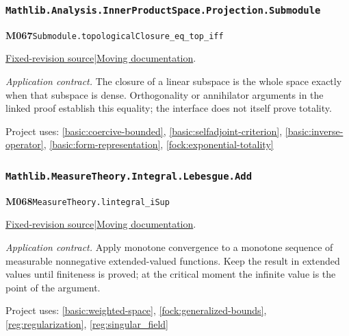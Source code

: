 \documentclass[11pt,a4paper]{article}
\theoremstyle{definition}
\theoremstyle{remark}
\begin{document}
\subsubsection*{\nolinkurl{Mathlib.Analysis.InnerProductSpace.Projection.Submodule}}
\noindent\textbf{M067}\label{base:M067}\quad\nolinkurl{Submodule.topologicalClosure_eq_top_iff}

\href{https://github.com/leanprover-community/mathlib4/blob/9bac2d0692944a775113f7c130fd5e5b4608a854/Mathlib/Analysis/InnerProductSpace/Projection/Submodule.lean}{Fixed-revision source}\quad|\quad\href{https://leanprover-community.github.io/mathlib4_docs/Mathlib/Analysis/InnerProductSpace/Projection/Submodule.html#Submodule.topologicalClosure_eq_top_iff}{Moving documentation}.\par
\noindent\textit{Application contract.} The closure of a linear subspace is the whole space exactly when that subspace is dense. Orthogonality or annihilator arguments in the linked proof establish this equality; the interface does not itself prove totality.\par
{\small Project uses: \ref{basic:coercive-bounded}, \ref{basic:selfadjoint-criterion}, \ref{basic:inverse-operator}, \ref{basic:form-representation}, \ref{fock:exponential-totality}}\par\medskip

\subsubsection*{\nolinkurl{Mathlib.MeasureTheory.Integral.Lebesgue.Add}}
\noindent\textbf{M068}\label{base:M068}\quad\nolinkurl{MeasureTheory.lintegral_iSup}

\href{https://github.com/leanprover-community/mathlib4/blob/9bac2d0692944a775113f7c130fd5e5b4608a854/Mathlib/MeasureTheory/Integral/Lebesgue/Add.lean}{Fixed-revision source}\quad|\quad\href{https://leanprover-community.github.io/mathlib4_docs/Mathlib/MeasureTheory/Integral/Lebesgue/Add.html#MeasureTheory.lintegral_iSup}{Moving documentation}.\par
\noindent\textit{Application contract.} Apply monotone convergence to a monotone sequence of measurable nonnegative extended-valued functions. Keep the result in extended values until finiteness is proved; at the critical moment the infinite value is the point of the argument.\par
{\small Project uses: \ref{basic:weighted-space}, \ref{fock:generalized-bounds}, \ref{reg:regularization}, \ref{reg:singular_field}}\par\medskip
\end{document}
